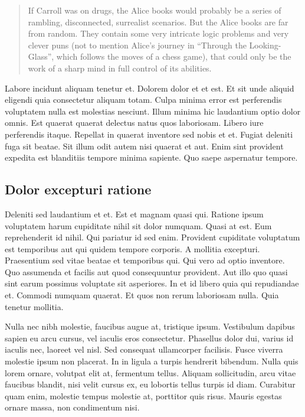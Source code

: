 \documentclass[12pt, a4paper]{article}
\begin{document}
\begin{quote}
    If Carroll was on drugs, the Alice books would probably be a series of rambling, disconnected, surrealist scenarios. But the Alice books are far from random. They contain some very intricate logic problems and very clever puns (not to mention Alice’s journey in “Through the Looking-Glass”, which follows the moves of a chess game), that could only be the work of a sharp mind in full control of its abilities. \autocite{rooy_faq}
\end{quote}

Labore incidunt aliquam tenetur et. Dolorem dolor et et est. Et sit unde aliquid eligendi quia consectetur aliquam totam. Culpa minima error est perferendis voluptatem nulla est molestias nesciunt. Illum minima hic laudantium optio dolor omnis. Est quaerat quaerat delectus natus quos laboriosam. Libero iure perferendis itaque. Repellat in quaerat inventore sed nobis et et. Fugiat deleniti fuga sit beatae. Sit illum odit autem nisi quaerat et aut. Enim sint provident expedita est blanditiis tempore minima sapiente. Quo saepe aspernatur tempore.

\subsection{Dolor excepturi ratione}

Deleniti sed laudantium et et. Est et magnam quasi qui. Ratione ipsum voluptatem harum cupiditate nihil sit dolor numquam. Quasi at est. Eum reprehenderit id nihil. Qui pariatur id sed enim. Provident cupiditate voluptatum est temporibus aut qui quidem tempore corporis. A mollitia excepturi. Praesentium sed vitae beatae et temporibus qui. Qui vero ad optio inventore. Quo assumenda et facilis aut quod consequuntur provident. Aut illo quo quasi sint earum possimus voluptate sit asperiores. In et id libero quia qui repudiandae et. Commodi numquam quaerat. Et quos non rerum laboriosam nulla. Quia tenetur mollitia.

Nulla nec nibh molestie, faucibus augue at, tristique ipsum. Vestibulum dapibus sapien eu arcu cursus, vel iaculis eros consectetur. Phasellus dolor dui, varius id iaculis nec, laoreet vel nisl. Sed consequat ullamcorper facilisis. Fusce viverra molestie ipsum non placerat. In in ligula a turpis hendrerit bibendum. Nulla quis lorem ornare, volutpat elit at, fermentum tellus. Aliquam sollicitudin, arcu vitae faucibus blandit, nisi velit cursus ex, eu lobortis tellus turpis id diam. Curabitur quam enim, molestie tempus molestie at, porttitor quis risus. Mauris egestas ornare massa, non condimentum nisi.
\end{document}
